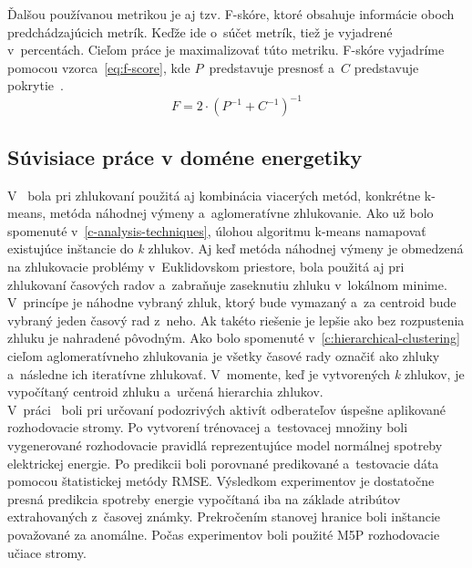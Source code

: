 \documentclass[a4paper,twoside,slovak,12pt,appendix]{article}
\begin{document}
Ďalšou používanou metrikou je aj tzv. F-skóre, ktoré obsahuje informácie oboch
predchádzajúcich metrík. Keďže ide o~súčet metrík, tiež je vyjadrené
v~percentách. Cieľom práce je maximalizovať túto metriku. F-skóre vyjadríme
pomocou vzorca~\ref{eq:f-score}, kde $P$~predstavuje presnosť a~$C$ predstavuje
pokrytie~\cite{Trevizan2015}.
\begin{equation}
	\label{eq:f-score}
  F = 2 \cdot \left( P^{-1} + C^{-1} \right)^{-1}
\end{equation}



\subsection{Súvisiace práce v doméne energetiky}
V~\cite{Hautamaki2008} bola pri zhlukovaní použitá aj kombinácia viacerých
metód, konkrétne k-means, metóda náhodnej výmeny a~aglomeratívne zhlukovanie.
Ako už bolo spomenuté v~\ref{c-analysis-techniques}, úlohou algoritmu k-means
namapovať existujúce inštancie do \textit{k} zhlukov. Aj keď metóda náhodnej
výmeny je obmedzená na zhlukovacie problémy v~Euklidovskom priestore, bola
použitá aj pri zhlukovaní časových radov a~zabraňuje zaseknutiu zhluku
v~lokálnom minime. V~princípe je náhodne vybraný zhluk, ktorý bude vymazaný a~za
centroid bude vybraný jeden časový rad z~neho. Ak takéto riešenie je lepšie ako
bez rozpustenia zhluku je nahradené pôvodným. Ako bolo spomenuté
v~\ref{c:hierarchical-clustering} cieľom aglomeratívneho zhlukovania je všetky
časové rady označiť ako zhluky a~následne ich iteratívne zhlukovať. V~momente,
keď je vytvorených \textit{k} zhlukov, je vypočítaný centroid zhluku a~určená
hierarchia zhlukov.\\

V~práci~\cite{Cody2015} boli pri určovaní podozrivých aktivít odberateľov
úspešne aplikované rozhodovacie stromy. Po vytvorení trénovacej a~testovacej
množiny boli vygenerované rozhodovacie pravidlá reprezentujúce model normálnej
spotreby elektrickej energie. Po predikcii boli porovnané predikované
a~testovacie dáta pomocou štatistickej metódy RMSE. Výsledkom experimentov je
dostatočne presná predikcia spotreby energie vypočítaná iba na základe atribútov
extrahovaných z~časovej známky. Prekročením stanovej hranice boli inštancie
považované za anomálne.  Počas experimentov boli použité M5P rozhodovacie učiace
stromy.\\
\end{document}
